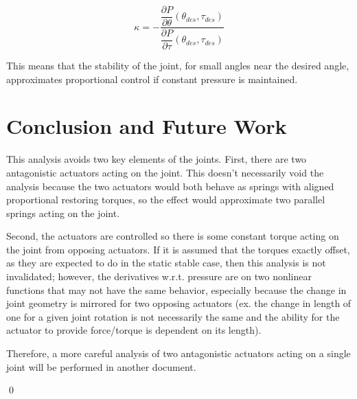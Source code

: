 \documentclass[12pt, letterpaper, oneside, notitlepage, onecolumn]{article}
\begin{document}
\begin{equation}
\kappa
=
- \dfrac{\dfrac{\partial P}{\partial \theta}(\theta_{des}, \tau_{des})}{
\dfrac{\partial P}{\partial \tau}(\theta_{des}, \tau_{des})}
\end{equation}

This means that the stability of the joint, for small angles near the desired
angle, approximates proportional control if constant pressure is maintained.

\section{Conclusion and Future Work}

This analysis avoids two key elements of the joints. First, there are two
antagonistic actuators acting on the joint. This doesn't necessarily void the
analysis because the two actuators would both behave as springs with aligned
proportional restoring torques, so the effect would approximate two parallel
springs acting on the joint.

Second, the actuators are controlled so there is some constant torque acting on
the joint from opposing actuators. If it is assumed that the torques exactly
offset, as they are expected to do in the static stable case, then this analysis
is not invalidated; however, the derivatives w.r.t. pressure are on two
nonlinear functions that may not have the same behavior, especially because the
change in joint geometry is mirrored for two opposing actuators (ex. the change
in length of one for a given joint rotation is not necessarily the same and the
ability for the actuator to provide force/torque is dependent on its length).

Therefore, a more careful analysis of two antagonistic actuators acting on a
single joint will be performed in another document.

\qed
\end{document}
